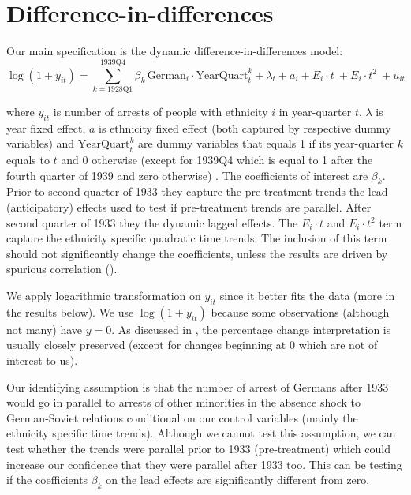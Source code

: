\section{Difference-in-differences}
Our main specification is the dynamic difference-in-differences model:
\begin{equation}
 \log\left(1 + y_{it}\right) = \sum_{k= \text{1928Q1}}^{\text{1939Q4}} \beta_k \, \text{German}_{i} \cdot \text{YearQuart}_{t}^k + \lambda_t + a_i +  E_i \cdot t \:  + E_i \cdot t^2 \:    + u_{it}
 \label{eq:dynamic_did}
\end{equation}


where $y_{it}$ is number of arrests of people with ethnicity $i$ in year-quarter $t$, $\lambda$ is year fixed effect, $a$ is ethnicity fixed effect (both captured by respective dummy variables) and  $\text{YearQuart}_{t}^k$ are dummy variables that equals 1 if its year-quarter $k$ equals to $t$ and 0 otherwise (except for 1939Q4 which is equal to 1 after the fourth quarter of 1939 and zero otherwise) . The coefficients of interest are $\beta_k$. 
Prior to second quarter of 1933 they capture the pre-treatment trends the lead (anticipatory) effects  used to test if pre-treatment trends are parallel. After second quarter of 1933 they the dynamic lagged effects.
The $ E_i \cdot t$ and $ E_i \cdot t^2$  term capture the ethnicity specific quadratic time trends. The inclusion of this term should not significantly  change the coefficients, unless the results are driven by spurious correlation (\citealt{angrist_mostly_2009}). 

 We apply logarithmic transformation on $y_{it}$ since it better fits the data (more in the results below).  We use $\log\left(1 + y_{it}\right)$ because some observations (although not many) have $y = 0$. As discussed in \citet[p. 193]{wooldridge_introductory_2015},  the percentage change interpretation is usually  closely preserved (except for changes beginning at 0 which are not of interest to us).   

Our identifying assumption is that the number of arrest of Germans after 1933 would go in parallel to arrests of other minorities in the absence shock to German-Soviet relations conditional on our control variables (mainly the ethnicity specific time trends). Although we cannot test this assumption, we can test whether the trends were parallel prior to 1933 (pre-treatment) which could increase our confidence that they were parallel after 1933 too. This can be testing if the coefficients $\beta_k$ on the lead effects are significantly different from zero.  

